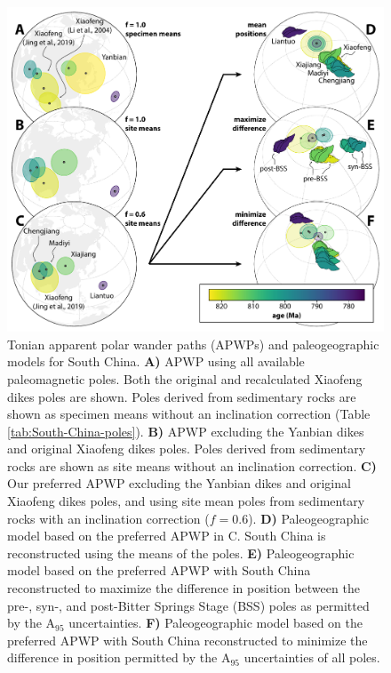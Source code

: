 \begin{figure}[h!]
    \centering
    \includegraphics[width=\textwidth]{figures/Xiajiang/SChina-APWP.pdf}
    \caption[Tonian apparent polar wander paths and paleogeographic models for South China.]{Tonian apparent polar wander paths (APWPs) and paleogeographic models for South China. \textbf{A)} APWP using all available paleomagnetic poles. Both the original \citep{Li2004a} and recalculated \citep{Jing2019a} Xiaofeng dikes poles are shown. Poles derived from sedimentary rocks are shown as specimen means without an inclination correction (Table \ref{tab:South-China-poles}). \textbf{B)} APWP excluding the Yanbian dikes and original Xiaofeng dikes poles. Poles derived from sedimentary rocks are shown as site means without an inclination correction. \textbf{C)} Our preferred APWP excluding the Yanbian dikes and original Xiaofeng dikes poles, and using site mean poles from sedimentary rocks with an inclination correction ($f=0.6$). \textbf{D)} Paleogeographic model based on the preferred APWP in C. South China is reconstructed using the means of the poles. \textbf{E)} Paleogeographic model based on the preferred APWP with South China reconstructed to maximize the difference in position between the pre-, syn-, and post-Bitter Springs Stage (BSS) poles as permitted by the A$_{95}$ uncertainties. \textbf{F)} Paleogeographic model based on the preferred APWP with South China reconstructed to minimize the difference in position permitted by the A$_{95}$ uncertainties of all poles.}
    \label{fig:SChina-APWP}
\end{figure}

